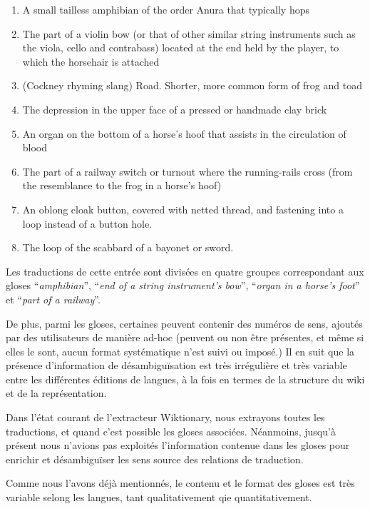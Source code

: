 \documentclass[10pt,a4paper,twoside]{article}
\begin{document}
\begin{small}\begin{enumerate}
\item A small tailless amphibian of the order Anura that typically hops
\item The part of a violin bow (or that of other similar string instruments such as the viola, cello and contrabass) located at the end held by the player, to which the horsehair is attached
\item (Cockney rhyming slang) Road. Shorter, more common form of frog and toad
\item The depression in the upper face of a pressed or handmade clay brick
\item An organ on the bottom of a horse’s hoof that assists in the circulation of blood
\item The part of a railway switch or turnout where the running-rails cross (from the resemblance to the frog in a horse’s hoof)
\item An oblong cloak button, covered with netted thread, and fastening into a loop instead of a button hole.
\item The loop of the scabbard of a bayonet or sword. 
\end{enumerate}\end{small}

Les traductions de cette entrée sont divisées en quatre groupes correspondant aux gloses ``\emph{amphibian}'', ``\emph{end of a string instrument’s bow}'', ``\emph{organ in a horse’s foot}'' et ``\emph{part of a railway}''.

De plus, parmi les gloses, certaines peuvent contenir des numéros de sens, ajoutés par des utilisateurs de manière ad-hoc (peuvent ou non être présentes, et même si elles le sont, aucun format systématique n'est suivi ou imposé.) Il en suit que la présence d'information de désambiguïsation est très irrégulière et très variable entre les différentes éditions de langues, à la fois en termes de la structure du wiki et de la représentation. 


Dans l'état courant de l'extracteur Wiktionary, nous extrayons toutes les traductions, et quand c'est possible les gloses associées.  Néanmoins, jusqu'à présent nous n'avions pas exploités l'information contenue dans les gloses pour enrichir et désambiguïser les sens source des relations de traduction.


Comme nous l'avons déjà mentionnés, le contenu et le format des gloses est très variable selong les langues, tant qualitativement qie quantitativement.
\end{document}

